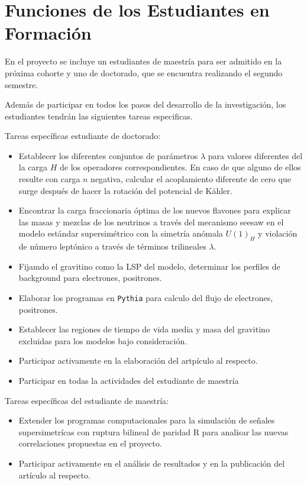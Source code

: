\section{ Funciones de los Estudiantes en Formación }



En el proyecto se incluye un estudiantes de maestría para ser admitido
en la próxima cohorte y uno de doctorado, que se encuentra realizando
el segundo semestre.

Además de participar en todos los pasos del desarrollo de la
investigación, los estudiantes  tendrán las siguientes
tareas especificas.

Tareas específicas estudiante de doctorado:
\begin{itemize}
\item Establecer los diferentes conjuntos de parámetros $\lambda$ para valores diferentes del la carga $H$ de los operadores correspondientes. En caso de que alguno de ellos resulte con carga $n$ negativa, calcular el acoplamiento diferente de cero que surge después de hacer la rotación del potencial de K\"ahler.
\item Encontrar la carga fraccionaria óptima de los nuevos flavones para explicar las masas y mezclas de los neutrinos a través del mecanismo seesaw en el modelo estándar supersimétrico con la simetría anómala $U(1)_H$ y violación de número leptónico a través de términos trilineales $\lambda$.
\item Fijamdo el gravitino como la LSP del modelo, determinar los perfiles de background para electrones, positrones.
\item Elaborar los programas en \texttt{Pythia} para calculo del flujo de electrones, positrones.
\item Establecer las regiones de tiempo de vida media y masa del gravitino excluidas para los modelos bajo consideración.
\item Participar activamente en la elaboración del artpículo al respecto.
\item Participar en todas la actividades del estudiante de maestría
\end{itemize}

Tareas específicas del estudiante de maestría:
\begin{itemize}
\item Extender los programas computacionales para la simulación de señales supersimetrícas con ruptura bilineal de paridad R para analisar las nuevas correlaciones propuestas en el proyecto.
\item Participar activamente en el análisis de resultados y en la
  publicación del artículo al respecto.
\end{itemize}


